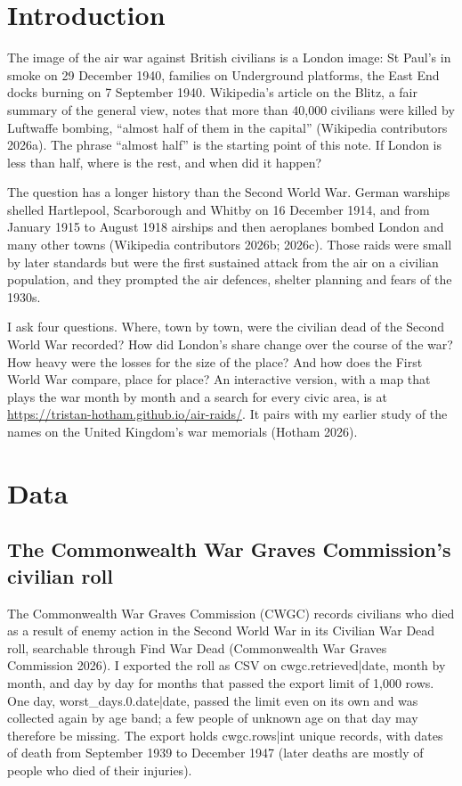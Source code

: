 \documentclass[11pt,a4paper]{article}
\begin{document}
\section{Introduction}

The image of the air war against British civilians is a London image: St Paul's in smoke on 29 December 1940, families on Underground platforms, the East End docks burning on 7 September 1940. Wikipedia's article on the Blitz, a fair summary of the general view, notes that more than 40,000 civilians were killed by Luftwaffe bombing, ``almost half of them in the capital'' (Wikipedia contributors 2026a). The phrase ``almost half'' is the starting point of this note. If London is less than half, where is the rest, and when did it happen?

The question has a longer history than the Second World War. German warships shelled Hartlepool, Scarborough and Whitby on 16 December 1914, and from January 1915 to August 1918 airships and then aeroplanes bombed London and many other towns (Wikipedia contributors 2026b; 2026c). Those raids were small by later standards but were the first sustained attack from the air on a civilian population, and they prompted the air defences, shelter planning and fears of the 1930s.

I ask four questions. Where, town by town, were the civilian dead of the Second World War recorded? How did London's share change over the course of the war? How heavy were the losses for the size of the place? And how does the First World War compare, place for place? An interactive version, with a map that plays the war month by month and a search for every civic area, is at \url{https://tristan-hotham.github.io/air-raids/}. It pairs with my earlier study of the names on the United Kingdom's war memorials (Hotham 2026).

\section{Data}

\subsection{The Commonwealth War Graves Commission's civilian roll}

The Commonwealth War Graves Commission (CWGC) records civilians who died as a result of enemy action in the Second World War in its Civilian War Dead roll, searchable through Find War Dead (Commonwealth War Graves Commission 2026). I exported the roll as CSV on {{cwgc.retrieved|date}}, month by month, and day by day for months that passed the export limit of 1,000 rows. One day, {{worst_days.0.date|date}}, passed the limit even on its own and was collected again by age band; a few people of unknown age on that day may therefore be missing. The export holds {{cwgc.rows|int}} unique records, with dates of death from September 1939 to December 1947 (later deaths are mostly of people who died of their injuries).
\end{document}

